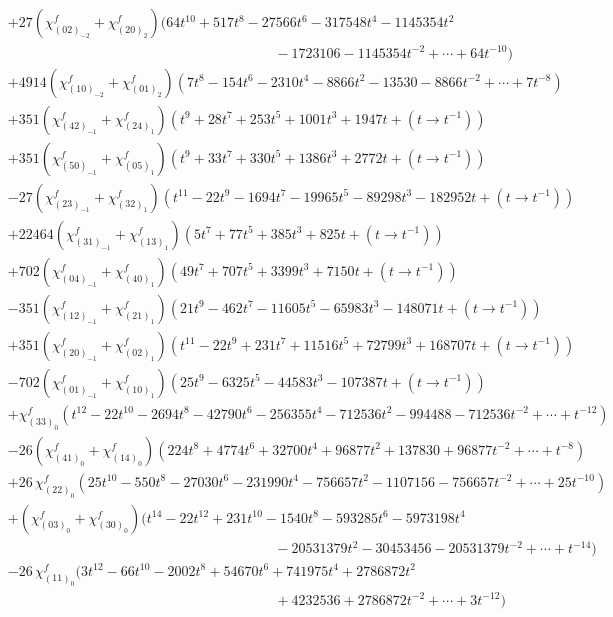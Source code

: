 \documentclass[letterpaper, 11pt]{article}
\newcommand{\nn}{\nonumber}
\begin{document}
{\begin{align}
&+27(\chi^f_{(02)_{-2}}+\chi^f_{(20)_2})(64 t^{10}+517 t^8-27566 t^6-317548 t^4-1145354 t^2\nn\\
&\hspace{8cm}-1723106-1145354 t^{-2}+\cdots+64t^{-10})\nn\\
&+4914(\chi^f_{(10)_{-2}}+\chi^f_{(01)_2})(7 t^8-154 t^6-2310 t^4-8866 t^2-13530-8866t^{-2}+\cdots+7t^{-8})\nn\\
&+351(\chi^f_{(42)_{-1}}+\chi^f_{(24)_1})(t^9+28 t^7+253 t^5+1001 t^3+1947t+(t\rightarrow t^{-1}))\nn\\
&+351(\chi^f_{(50)_{-1}}+\chi^f_{(05)_1})(t^9+33 t^7+330 t^5+1386 t^3+2772t+(t\rightarrow t^{-1}))\nn\\
&-27(\chi^f_{(23)_{-1}}+\chi^f_{(32)_1})(t^{11}-22 t^9-1694 t^7-19965 t^5-89298 t^3-182952t+(t\rightarrow t^{-1}))\nn\\
&+22464(\chi^f_{(31)_{-1}}+\chi^f_{(13)_1})(5 t^7+77 t^5+385 t^3+825t+(t\rightarrow t^{-1}))\nn\\
&+702(\chi^f_{(04)_{-1}}+\chi^f_{(40)_1})(49 t^7+707 t^5+3399 t^3+7150t+(t\rightarrow t^{-1}))\nn\\
&-351(\chi^f_{(12)_{-1}}+\chi^f_{(21)_1})(21 t^9-462 t^7-11605 t^5-65983 t^3-148071t+(t\rightarrow t^{-1}))\nn\\
&+351(\chi^f_{(20)_{-1}}+\chi^f_{(02)_1})(t^{11}-22 t^9+231 t^7+11516 t^5+72799 t^3+168707t+(t\rightarrow t^{-1}))\nn\\
&-702(\chi^f_{(01)_{-1}}+\chi^f_{(10)_1})(25 t^9-6325 t^5-44583 t^3-107387t+(t\rightarrow t^{-1}))\nn\\
&+\chi^f_{(33)_0}(t^{12}-22 t^{10}-2694 t^8-42790 t^6-256355 t^4-712536 t^2-994488-712536 t^{-2}+\cdots+t^{-12})\nn\\
&-26(\chi^f_{(41)_0}+\chi^f_{(14)_0})(224 t^8+4774 t^6+32700 t^4+96877 t^2+137830+96877 t^{-2}+\cdots+t^{-8})\nn\\
&+26\,\chi^f_{(22)_0}(25 t^{10}-550 t^8-27030 t^6-231990 t^4-756657 t^2-1107156-756657 t^{-2}+\cdots+25t^{-10})\nn\\
&+(\chi^f_{(03)_0}+\chi^f_{(30)_0})(t^{14}-22 t^{12}+231 t^{10}-1540 t^8-593285 t^6-5973198 t^4\nn\\
&\hspace{8cm}-20531379 t^2-30453456-20531379 t^{-2}+\cdots+t^{-14})\nn\\
&-26\,\chi^f_{(11)_0}(3 t^{12}-66 t^{10}-2002 t^8+54670 t^6+741975 t^4+2786872 t^2\nn\\
&\hspace{8cm}+4232536+2786872 t^{-2}+\cdots+3t^{-12})\nn\\

\end{align}}
\end{document}
